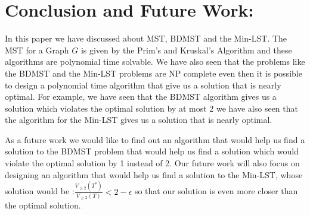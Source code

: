 \documentclass[12pt]{article}
\theoremstyle{plain}
\begin{document}
\section*{Conclusion and Future Work: }

In this paper we have discussed about MST, BDMST and the Min-LST. The MST for a Graph $G$ is given by the 
Prim's and Kruskal's Algorithm and these algorithms are polynomial time solvable. We have also seen that the 
problems like the BDMST and the Min-LST problems are NP complete even then it is possible to design a 
polynomial time algorithm that give us a solution that is nearly optimal. For example, we have seen that the 
BDMST algorithm gives us a solution which violates the optimal solution by at most 2 we have also seen that 
the algorithm for the Min-LST gives us a solution that is nearly optimal.

As a future work we would like to find out an algorithm that would help us find a solution to the BDMST 
problem that would help us find a solution which would violate the optimal solution by 1 instead of 2. Our 
future work will also focus on designing an algorithm that would help us find a solution to the Min-LST, whose 
solution would be :$\frac{V_{\geq 2}(T^*)}{V_{\geq 2}(T)} < 2-\epsilon$ so that our solution is even more 
closer than the optimal solution.






 
\end{document}
